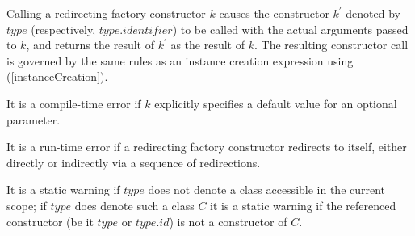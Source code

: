 \documentclass{article}
\begin{document}
\LMHash{}
Calling a redirecting factory constructor $k$ causes the constructor $k^\prime$ denoted by $type$ (respectively, $type.identifier$) to be called with the actual arguments passed to $k$, and returns the result of $k^\prime$ as the result of $k$.  The resulting constructor call is governed by the same rules as an instance creation expression using \NEW{} (\ref{instanceCreation}).


\LMHash{}
It is a compile-time error if $k$ explicitly specifies a default value for an optional parameter.

\LMHash{}
It is a run-time error if a redirecting factory constructor redirects to itself, either directly or indirectly via a sequence of redirections. %




\LMHash{}
It is a static warning if $type$ does not denote a class accessible in the current scope; if $type$ does denote such a class $C$ it is a static warning if the referenced constructor (be it $type$ or $type.id$) is not a constructor of $C$.
\end{document}
